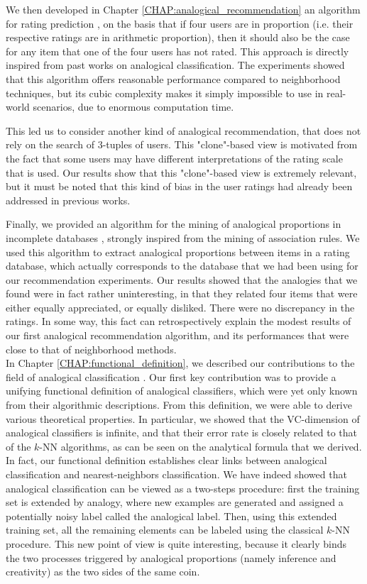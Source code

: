 We then developed in Chapter \ref{CHAP:analogical_recommendation} an algorithm
for rating prediction \cite{HugPraRicISMIS15}, on the basis that if four users
are in proportion (i.e. their respective ratings are in arithmetic proportion),
then it should also be the case for any item that one of the four users has not
rated. This approach is directly inspired from past works on analogical
classification. The experiments showed that this algorithm offers reasonable
performance compared to neighborhood techniques, but its cubic complexity makes
it simply impossible to use in real-world scenarios, due to enormous
computation time.

This led us to consider another kind of analogical recommendation, that does
not rely on the search of $3$-tuples of users. This "clone"-based view
\cite{HugPraRicSerFuzzIEEE16} is motivated from the fact that some users may
have different interpretations of the rating scale that is used. Our results
show that this "clone"-based view is extremely relevant, but it must be noted
that this kind of bias in the user ratings had already been addressed in
previous works.

Finally, we provided an algorithm for the mining of analogical proportions in
incomplete databases \cite{HugPraRicSerLFA16}, strongly inspired from the
mining of association rules. We used this algorithm to extract analogical
proportions between items in a rating database, which actually corresponds to
the database that we had been using for our recommendation experiments. Our
results showed that the analogies that we found were in fact rather
uninteresting, in that they related four items that were either equally
appreciated, or equally disliked. There were no discrepancy in the ratings. In
some way, this fact can retrospectively explain the modest results of our first
analogical recommendation algorithm, and its performances that were close to
that of neighborhood methods.\\

In Chapter \ref{CHAP:functional_definition}, we described our contributions to
the field of analogical classification \cite{HugPraRicSerECAI16}. Our first key
contribution was to provide a unifying functional definition of analogical
classifiers, which were yet only known from their algorithmic descriptions.
From this definition, we were able to derive various theoretical properties. In
particular, we showed that the VC-dimension of analogical classifiers is
infinite, and that their error rate is closely related to that of the $k$-NN
algorithms, as can be seen on the analytical formula that we derived. In fact,
our functional definition establishes clear links between analogical
classification and nearest-neighbors classification. We have indeed showed that
analogical classification can be viewed as a two-steps procedure: first the
training set is extended by analogy, where new examples are generated and
assigned a potentially noisy label called the analogical label. Then, using
this extended training set, all the remaining elements can be labeled using the
classical $k$-NN procedure. This new point of view is quite interesting,
because it clearly binds the two processes triggered by analogical proportions
(namely inference and creativity) as the two sides of the same coin.


